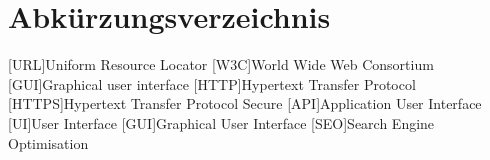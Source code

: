 \newpage
\chapter*{Abkürzungsverzeichnis}
\begin{acronym}
    [URL]{Uniform Resource Locator}
    [W3C]{World Wide Web Consortium}
    [GUI]{Graphical user interface}
    [HTTP]{Hypertext Transfer Protocol}
    [HTTPS]{Hypertext Transfer Protocol Secure}
    [API]{Application User Interface}
    [UI]{User Interface}
    [GUI]{Graphical User Interface}
    [SEO]{Search Engine Optimisation}
\end{acronym}